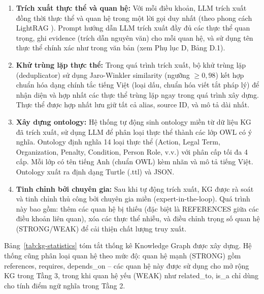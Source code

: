 \begin{enumerate}
  \item \textbf{Trích xuất thực thể và quan hệ:} Với mỗi điều khoản, LLM trích
        xuất đồng thời thực thể và quan hệ trong một lời gọi duy nhất (theo phong
        cách LightRAG \cite{guo2025lightrag}). Prompt hướng dẫn LLM trích xuất
        đầy đủ các thực thể quan trọng, ghi evidence (trích dẫn nguyên văn) cho
        mỗi quan hệ, và sử dụng tên thực thể chính xác như trong văn bản (xem Phụ
        lục D, Bảng D.1).

  \item \textbf{Khử trùng lặp thực thể:} Trong quá trình trích xuất, bộ khử trùng
        lặp (deduplicator) sử dụng Jaro-Winkler similarity (ngưỡng $\geq 0{,}98$)
        kết hợp chuẩn hóa dạng chính tắc tiếng Việt (loại dấu, chuẩn hóa viết tắt
        pháp lý) để nhận diện và hợp nhất các thực thể trùng lặp ngay trong quá
        trình xây dựng. Thực thể được hợp nhất lưu giữ tất cả alias, source ID, và
        mô tả dài nhất.

  \item \textbf{Xây dựng ontology:} Hệ thống tự động sinh ontology miền từ dữ
        liệu KG đã trích xuất, sử dụng LLM để phân loại thực thể thành các lớp OWL
        có ý nghĩa. Ontology định nghĩa 14 loại thực thể (Action, Legal Term,
        Organization, Penalty, Condition, Person Role, v.v.) với phân cấp tối đa 4
        cấp. Mỗi lớp có tên tiếng Anh (chuẩn OWL) kèm nhãn và mô tả tiếng Việt.
        Ontology xuất ra định dạng Turtle (.ttl) và JSON.

  \item \textbf{Tinh chỉnh bởi chuyên gia:} Sau khi tự động trích xuất, KG được
        rà soát và tinh chỉnh thủ công bởi chuyên gia miền (expert-in-the-loop).
        Quá trình này bao gồm: thêm các quan hệ bị thiếu (đặc biệt là REFERENCES
        giữa các điều khoản liên quan), xóa các thực thể nhiễu, và điều chỉnh
        trọng số quan hệ (STRONG/WEAK) để cải thiện chất lượng truy xuất.
\end{enumerate}

Bảng~\ref{tab:kg-statistics} tóm tắt thống kê Knowledge Graph được xây dựng. Hệ
thống cũng phân loại quan hệ theo mức độ: quan hệ mạnh (STRONG) gồm references,
requires, depends\_on -- các quan hệ này được sử dụng cho mở rộng KG trong Tầng 3,
trong khi quan hệ yếu (WEAK) như related\_to, is\_a chỉ dùng cho tính điểm ngữ
nghĩa trong Tầng 2.

